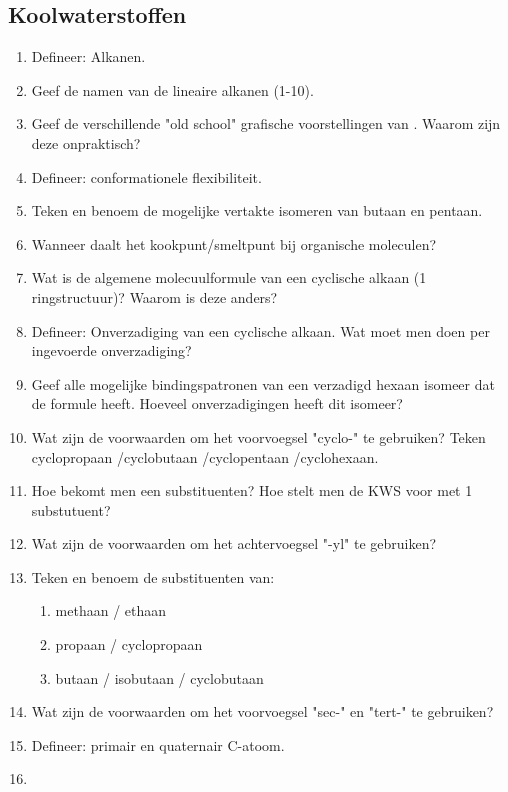 \documentclass[a4paper,12pt]{article}
\begin{document}
    \subsection*{Koolwaterstoffen}
    \begin{enumerate}
        \item Defineer: Alkanen. 
        \item Geef de namen van de lineaire alkanen (1-10). 
        \item Geef de verschillende "old school" grafische voorstellingen van . Waarom zijn deze onpraktisch?
        \item Defineer: conformationele flexibiliteit. 
        \item Teken en benoem de mogelijke vertakte isomeren van butaan en pentaan. 
        \item Wanneer daalt het kookpunt/smeltpunt bij organische moleculen? 
        \item Wat is de algemene molecuulformule van een cyclische alkaan (1 ringstructuur)? Waarom is deze anders?
        \item Defineer: Onverzadiging van een cyclische alkaan. Wat moet men doen per ingevoerde onverzadiging?
        \item Geef alle mogelijke bindingspatronen van een verzadigd hexaan isomeer dat de formule  heeft. Hoeveel onverzadigingen heeft dit isomeer?
        \item Wat zijn de voorwaarden om het voorvoegsel "cyclo-" te gebruiken? Teken cyclopropaan /cyclobutaan /cyclopentaan /cyclohexaan.
        \item Hoe bekomt men een substituenten? Hoe stelt men de KWS voor met 1 substutuent?
        \item Wat zijn de voorwaarden om het achtervoegsel "-yl" te gebruiken?
        \item Teken en benoem de substituenten van:
                \begin{enumerate}
                    \item methaan / ethaan
                    \item propaan / cyclopropaan
                    \item butaan / isobutaan / cyclobutaan
                \end{enumerate}
        \item Wat zijn de voorwaarden om het voorvoegsel "sec-" en "tert-" te gebruiken?
        \item Defineer: primair en quaternair C-atoom. 
        \item 
    \end{enumerate}
\end{document}
